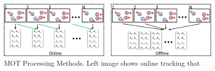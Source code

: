 \begin{figure}[!htbp]
  \centering
  \includegraphics[width=0.8\linewidth]{img/mot_processing_mod.jpg}
  \caption[MOT Processing Methods]{%
    MOT Processing Methods. Left image shows online tracking that 
  }
  \label{fig:mot_processing_mod}
\end{figure}
